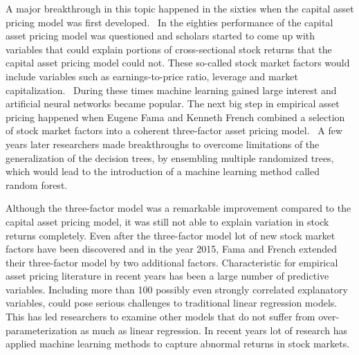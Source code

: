 \documentclass[12pt]{article}
\begin{document}
A major breakthrough in this topic happened in the sixties when the capital asset pricing model was first developed.\footnotemark {} \ In the eighties performance of the capital asset pricing model was questioned and scholars started to come up with variables that could explain portions of cross-sectional stock returns that the capital asset pricing model could not. These so-called stock market factors would include variables such as earnings-to-price ratio, leverage and market capitalization.\footnotemark  {} \ During these times machine learning gained large interest and artificial neural networks became popular. The next big step in empirical asset pricing happened when Eugene Fama and Kenneth French combined a selection of stock market factors into a coherent three-factor asset pricing model.\footnotemark {} \ A few years later researchers made breakthroughs to overcome limitations of the generalization of the decision trees, by ensembling multiple randomized trees, which would lead to the introduction of a machine learning method called random forest.\footnotemark {} \par

Although the three-factor model was a remarkable improvement compared to the capital asset pricing model, it was still not able to explain variation in stock returns completely. Even after the three-factor model lot of new stock market factors have been discovered and in the year 2015, Fama and French extended their three-factor model by two additional factors.\footnotemark {} Characteristic for empirical asset pricing literature in recent years has been a large number of predictive variables. Including more than 100 possibly even strongly correlated explanatory variables, could pose serious challenges to traditional linear regression models. This has led researchers to examine other models that do not suffer from over-parameterization as much as linear regression. In recent years lot of research has applied machine learning methods to capture abnormal returns in stock markets.  \par
\end{document}
